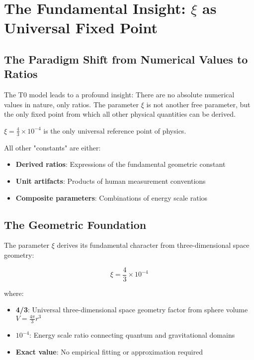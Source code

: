 \documentclass[12pt,a4paper]{report}
\begin{document}
	\section{The Fundamental Insight: $\xi$ as Universal Fixed Point}
	\label{sec:xi_universal_fixed_point}
	
	\subsection{The Paradigm Shift from Numerical Values to Ratios}
	\label{subsec:paradigm_shift_ratios}
	
	The T0 model leads to a profound insight: There are no absolute numerical values in nature, only ratios. The parameter $\xi$ is not another free parameter, but the only fixed point from which all other physical quantities can be derived.
	
	\begin{tcolorbox}[colback=red!5!white,colframe=red!75!black,title=Fundamental Insight]
		$\xi = \frac{4}{3} \times 10^{-4}$ is the only universal reference point of physics.
		
		All other "constants" are either:
		\begin{itemize}
			\item \textbf{Derived ratios}: Expressions of the fundamental geometric constant
			\item \textbf{Unit artifacts}: Products of human measurement conventions
			\item \textbf{Composite parameters}: Combinations of energy scale ratios
		\end{itemize}
	\end{tcolorbox}
	
	\subsection{The Geometric Foundation}
	\label{subsec:geometric_foundation}
	
	The parameter $\xi$ derives its fundamental character from three-dimensional space geometry:
	
	\begin{equation}
		\xi = \frac{4}{3} \times 10^{-4}
	\end{equation}
	
	where:
	\begin{itemize}
		\item \textbf{4/3}: Universal three-dimensional space geometry factor from sphere volume $V = \frac{4\pi}{3}r^3$
		\item \textbf{$10^{-4}$}: Energy scale ratio connecting quantum and gravitational domains
		\item \textbf{Exact value}: No empirical fitting or approximation required
	\end{itemize}
	
\end{document}
